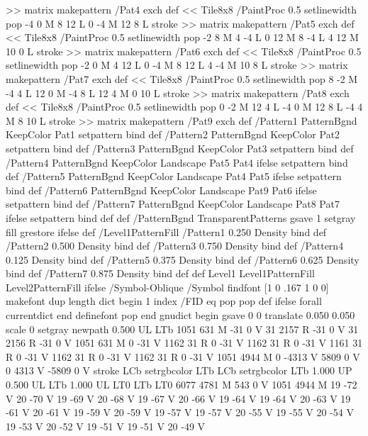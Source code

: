 {{{>> matrix makepattern
/Pat4 exch def
<< Tile8x8
 /PaintProc {0.5 setlinewidth pop -4 0 M 8 12 L
	0 -4 M 12 8 L stroke}
>> matrix makepattern
/Pat5 exch def
<< Tile8x8
 /PaintProc {0.5 setlinewidth pop -2 8 M 4 -4 L
	0 12 M 8 -4 L 4 12 M 10 0 L stroke}
>> matrix makepattern
/Pat6 exch def
<< Tile8x8
 /PaintProc {0.5 setlinewidth pop -2 0 M 4 12 L
	0 -4 M 8 12 L 4 -4 M 10 8 L stroke}
>> matrix makepattern
/Pat7 exch def
<< Tile8x8
 /PaintProc {0.5 setlinewidth pop 8 -2 M -4 4 L
	12 0 M -4 8 L 12 4 M 0 10 L stroke}
>> matrix makepattern
/Pat8 exch def
<< Tile8x8
 /PaintProc {0.5 setlinewidth pop 0 -2 M 12 4 L
	-4 0 M 12 8 L -4 4 M 8 10 L stroke}
>> matrix makepattern
/Pat9 exch def
/Pattern1 {PatternBgnd KeepColor Pat1 setpattern} bind def
/Pattern2 {PatternBgnd KeepColor Pat2 setpattern} bind def
/Pattern3 {PatternBgnd KeepColor Pat3 setpattern} bind def
/Pattern4 {PatternBgnd KeepColor Landscape {Pat5} {Pat4} ifelse setpattern} bind def
/Pattern5 {PatternBgnd KeepColor Landscape {Pat4} {Pat5} ifelse setpattern} bind def
/Pattern6 {PatternBgnd KeepColor Landscape {Pat9} {Pat6} ifelse setpattern} bind def
/Pattern7 {PatternBgnd KeepColor Landscape {Pat8} {Pat7} ifelse setpattern} bind def
} def
%
%
%
/PatternBgnd {
  TransparentPatterns {} {gsave 1 setgray fill grestore} ifelse
} def
%
%
/Level1PatternFill {
/Pattern1 {0.250 Density} bind def
/Pattern2 {0.500 Density} bind def
/Pattern3 {0.750 Density} bind def
/Pattern4 {0.125 Density} bind def
/Pattern5 {0.375 Density} bind def
/Pattern6 {0.625 Density} bind def
/Pattern7 {0.875 Density} bind def
} def
%
%
Level1 {Level1PatternFill} {Level2PatternFill} ifelse
%
/Symbol-Oblique /Symbol findfont [1 0 .167 1 0 0] makefont
dup length dict begin {1 index /FID eq {pop pop} {def} ifelse} forall
currentdict end definefont pop
end
gnudict begin
gsave
0 0 translate
0.050 0.050 scale
0 setgray
newpath
0.500 UL
LTb
1051 631 M
-31 0 V
31 2157 R
-31 0 V
31 2156 R
-31 0 V
1051 631 M
0 -31 V
1162 31 R
0 -31 V
1162 31 R
0 -31 V
1161 31 R
0 -31 V
1162 31 R
0 -31 V
1162 31 R
0 -31 V
1051 4944 M
0 -4313 V
5809 0 V
0 4313 V
-5809 0 V
stroke
LCb setrgbcolor
LTb
LCb setrgbcolor
LTb
1.000 UP
0.500 UL
LTb
1.000 UL
LT0
LTb
LT0
6077 4781 M
543 0 V
1051 4944 M
19 -72 V
20 -70 V
19 -69 V
20 -68 V
19 -67 V
20 -66 V
19 -64 V
19 -64 V
20 -63 V
19 -61 V
20 -61 V
19 -59 V
20 -59 V
19 -57 V
19 -57 V
20 -55 V
19 -55 V
20 -54 V
19 -53 V
20 -52 V
19 -51 V
19 -51 V
20 -49 V
}}
